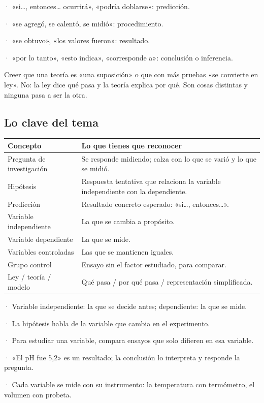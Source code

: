 \begin{clave} · «si\dots{}, entonces\dots{} ocurrirá», «podría doblarse»: predicción.\par · «se agregó, se calentó, se midió»: procedimiento.\par · «se obtuvo», «los valores fueron»: resultado.\par · «por lo tanto», «esto indica», «corresponde a»: conclusión o inferencia.\end{clave}
  
\begin{ojo} Creer que una teoría es «una suposición» o que con más pruebas «se convierte en ley». No: la ley dice qué pasa y la teoría explica por qué. Son cosas distintas y ninguna pasa a ser la otra.\end{ojo}
\subsection{Lo clave del tema}
\begin{center}\small
\begin{tabularx}{\linewidth}{@{}>{\raggedright\arraybackslash\hsize=0.77\hsize}X>{\raggedright\arraybackslash\hsize=1.23\hsize}X@{}}
\toprule
\textbf{Concepto} & \textbf{Lo que tienes que reconocer} \\
\midrule
Pregunta de investigación & Se responde midiendo; calza con lo que se varió y lo que se midió. \\
Hipótesis & Respuesta tentativa que relaciona la variable independiente con la dependiente. \\
Predicción & Resultado concreto esperado: «si\dots{}, entonces\dots{}». \\
Variable independiente & La que se cambia a propósito. \\
Variable dependiente & La que se mide. \\
Variables controladas & Las que se mantienen iguales. \\
Grupo control & Ensayo sin el factor estudiado, para comparar. \\
Ley / teoría / modelo & Qué pasa / por qué pasa / representación simplificada. \\
\bottomrule
\end{tabularx}
\end{center}
 
\begin{clave}[{Recuerda}] · Variable independiente: la que se decide antes; dependiente: la que se mide.\par · La hipótesis habla de la variable que cambia en el experimento.\par · Para estudiar una variable, compara ensayos que solo difieren en esa variable.\par · «El pH fue 5,2» es un resultado; la conclusión lo interpreta y responde la pregunta.\par · Cada variable se mide con su instrumento: la temperatura con termómetro, el volumen con probeta.\end{clave}
 
